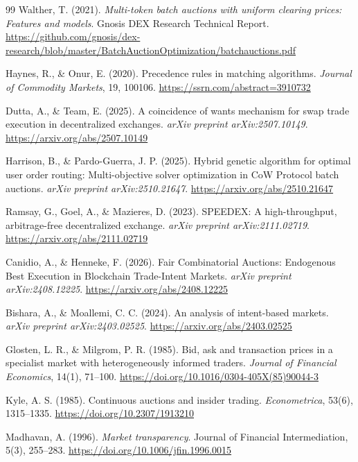 \documentclass[11pt]{article}
\begin{document}
\begin{thebibliography}{99}
Walther, T. (2021).
\textit{Multi-token batch auctions with uniform clearing prices: Features and models}.
Gnosis DEX Research Technical Report.
\url{https://github.com/gnosis/dex-research/blob/master/BatchAuctionOptimization/batchauctions.pdf}

Haynes, R., \& Onur, E. (2020).
Precedence rules in matching algorithms.
\textit{Journal of Commodity Markets}, 19, 100106.
\url{https://ssrn.com/abstract=3910732}

Dutta, A., \& Team, E. (2025).
A coincidence of wants mechanism for swap trade execution in decentralized exchanges.
\textit{arXiv preprint arXiv:2507.10149}.
\url{https://arxiv.org/abs/2507.10149}

Harrison, B., \& Pardo-Guerra, J. P. (2025).
Hybrid genetic algorithm for optimal user order routing: Multi-objective solver optimization in CoW Protocol batch auctions.
\textit{arXiv preprint arXiv:2510.21647}.
\url{https://arxiv.org/abs/2510.21647}

Ramsay, G., Goel, A., \& Mazieres, D. (2023).
SPEEDEX: A high-throughput, arbitrage-free decentralized exchange.
\textit{arXiv preprint arXiv:2111.02719}.
\url{https://arxiv.org/abs/2111.02719}

Canidio, A., \& Henneke, F. (2026).
Fair Combinatorial Auctions: Endogenous Best Execution in Blockchain Trade-Intent Markets.
\textit{arXiv preprint arXiv:2408.12225}.
\url{https://arxiv.org/abs/2408.12225}

Bishara, A., \& Moallemi, C. C. (2024).
An analysis of intent-based markets.
\textit{arXiv preprint arXiv:2403.02525}.
\url{https://arxiv.org/abs/2403.02525}

Glosten, L. R., \& Milgrom, P. R. (1985).
Bid, ask and transaction prices in a specialist market with heterogeneously informed traders.
\textit{Journal of Financial Economics}, 14(1), 71--100.
\url{https://doi.org/10.1016/0304-405X(85)90044-3}

Kyle, A. S. (1985).
Continuous auctions and insider trading.
\textit{Econometrica}, 53(6), 1315--1335.
\url{https://doi.org/10.2307/1913210}

Madhavan, A. (1996).
\textit{Market transparency}.
Journal of Financial Intermediation, 5(3), 255--283.
\url{https://doi.org/10.1006/jfin.1996.0015}


\end{thebibliography}
\end{document}
